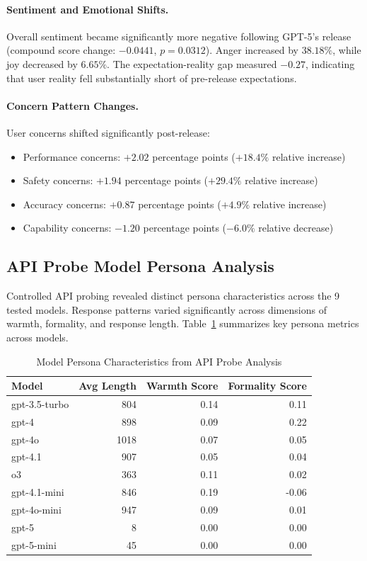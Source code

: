 \documentclass{article}
\begin{document}
\paragraph{Sentiment and Emotional Shifts.}
Overall sentiment became significantly more negative following GPT-5's release (compound score change: $-0.0441$, $p=0.0312$). Anger increased by $38.18\%$, while joy decreased by $6.65\%$. The expectation-reality gap measured $-0.27$, indicating that user reality fell substantially short of pre-release expectations.

\paragraph{Concern Pattern Changes.}
User concerns shifted significantly post-release:
\begin{itemize}
    \item Performance concerns: $+2.02$ percentage points ($+18.4\%$ relative increase)
    \item Safety concerns: $+1.94$ percentage points ($+29.4\%$ relative increase)  
    \item Accuracy concerns: $+0.87$ percentage points ($+4.9\%$ relative increase)
    \item Capability concerns: $-1.20$ percentage points ($-6.0\%$ relative decrease)
\end{itemize}

\subsection{API Probe Model Persona Analysis}

Controlled API probing revealed distinct persona characteristics across the 9 tested models. Response patterns varied significantly across dimensions of warmth, formality, and response length. Table~\ref{tab:model_personas} summarizes key persona metrics across models.

\begin{table}[htbp]
\centering
\caption{Model Persona Characteristics from API Probe Analysis}
\label{tab:model_personas}
\begin{tabular}{@{}lrrr@{}}
\toprule
Model & Avg Length & Warmth Score & Formality Score \\
\midrule
gpt-3.5-turbo & 804 & 0.14 & 0.11 \\
gpt-4 & 898 & 0.09 & 0.22 \\
gpt-4o & 1018 & 0.07 & 0.05 \\
gpt-4.1 & 907 & 0.05 & 0.04 \\
o3 & 363 & 0.11 & 0.02 \\
gpt-4.1-mini & 846 & 0.19 & -0.06 \\
gpt-4o-mini & 947 & 0.09 & 0.01 \\
gpt-5 & 8 & 0.00 & 0.00 \\
gpt-5-mini & 45 & 0.00 & 0.00 \\
\bottomrule
\end{tabular}
\end{table}
\end{document}
